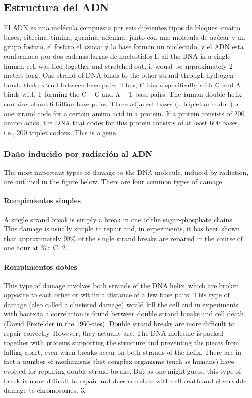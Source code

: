 \subsection{Estructura del ADN}
El ADN es una molécula compuesta por seis diferentes tipos de bloques: cuatro bases, citocina, timina, guanina, adenina, junto con una molécula de azúcar y un grupo fosfato, el fosfato el azucar y la base forman un nucleotido, y el ADN esta conformado por dos cadenas largas de nucleotidos
If all the DNA in a single human cell was tied together and stretched out, it would be approximately 2 meters long. One strand of DNA binds to the other strand through hydrogen bonds that extend between base pairs. Thus, C binds specifically with G and A binds with T forming the C – G and A – T base pairs.
The human double helix contains about 6 billion base pairs. Three adjacent bases (a triplet or codon) on one strand code for a certain amino acid in a protein. If a protein consists of 200 amino acids, the DNA that codes for this protein consists of at least 600 bases, i.e., 200 triplet codons. This is a gene.

\subsubsection{Daño inducido por radiación al ADN}
The most important types of damage to the DNA molecule, induced by radiation, are outlined in the figure below. There are four common types of damage
\paragraph{Rompimientos simples}
A single strand break is simply a break in one of the sugar-phosphate chains. This damage is usually simple to repair and, in experiments, it has been shown that approximately 90\% of the single strand breaks are repaired in the course of one hour at 37o
C. 2.
\paragraph{Rompimientos dobles}
This type of damage involves both strands of the DNA helix, which are broken opposite to each other or within a distance of a few base pairs. This type of damage (also called a clustered damage) would kill the cell and in experiments with bacteria a correlation is found between double strand breaks and cell death (David Freifelder in the 1960-ties).
Double strand breaks are more difficult to repair correctly. However, they actually are. The DNA-molecule is packed together with proteins supporting the structure and preventing the pieces from falling apart, even when breaks occur on both strands of the helix. There are in fact a number of mechanisms that complex organisms (such as humans) have evolved for repairing double strand breaks. But as one might guess, this type of break is more difficult to repair and does correlate with cell death and observable damage to chromosomes.
3.
